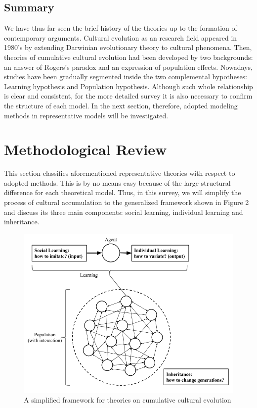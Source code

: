 \documentclass[a4paper, dvipdfmx]{article}
\begin{document}
\subsection*{Summary}
We have thus far seen the brief history of the theories up to the formation of contemporary arguments. Cultural evolution as an research field appeared in 1980's by extending Darwinian evolutionary theory to cultural phenomena. Then, theories of cumulative cultural evolution had been developed by two backgrounds: an answer of Rogers's paradox and an expression of population effects. Nowadays, studies have been gradually segmented inside the two complemental hypotheses: Learning hypothesis and Population hypothesis. Although such whole relationship is clear and consistent, for the more detailed survey it is also necessary to confirm the structure of each model. In the next section, therefore, adopted modeling methods in representative models will be investigated.


\section{Methodological Review}

This section classifies aforementioned representative theories with respect to adopted methods. This is by no means easy because of the large structural difference for each theoretical model. Thus, in this survey, we will simplify the process of cultural accumulation to the generalized framework shown in Figure 2 and discuss its three main components: social learning, individual learning and inheritance.

\begin{figure}[H]
  \centering
  \includegraphics[width=12cm]{fig2_2.png}
  \caption{A simplified framework for theories on cumulative cultural evolution}
  \label{Figure2}
\end{figure}
\end{document}
